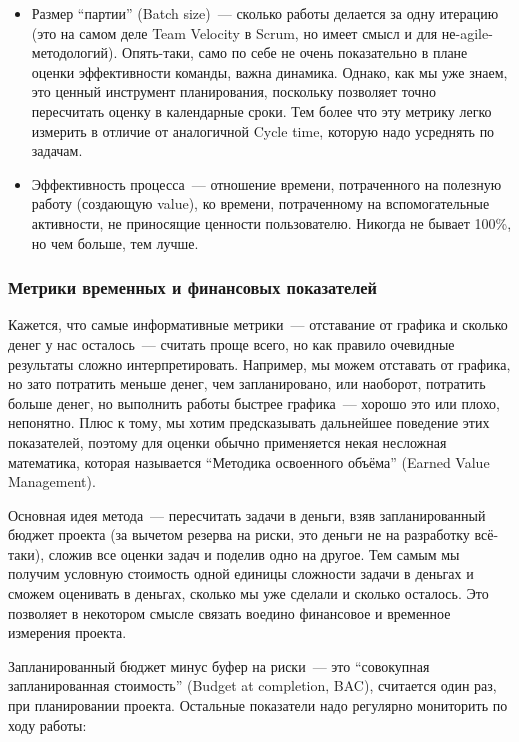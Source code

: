\documentclass{../../text-style}
\begin{document}
\begin{itemize}
    \item Размер \enquote{партии} (Batch size)~--- сколько работы делается за одну итерацию (это на самом деле Team Velocity в Scrum, но имеет смысл и для не-agile-методологий). Опять-таки, само по себе не очень показательно в плане оценки эффективности команды, важна динамика. Однако, как мы уже знаем, это ценный инструмент планирования, поскольку позволяет точно пересчитать оценку в календарные сроки. Тем более что эту метрику легко измерить в отличие от аналогичной Cycle time, которую надо усреднять по задачам.
    \item Эффективность процесса~--- отношение времени, потраченного на полезную работу (создающую value), ко времени, потраченному на вспомогательные активности, не приносящие ценности пользователю. Никогда не бывает 100\%, но чем больше, тем лучше.
\end{itemize}

\subsubsection{Метрики временных и финансовых показателей}

Кажется, что самые информативные метрики~--- отставание от графика и сколько денег у нас осталось~--- считать проще всего, но как правило очевидные результаты сложно интерпретировать. Например, мы можем отставать от графика, но зато потратить меньше денег, чем запланировано, или наоборот, потратить больше денег, но выполнить работы быстрее графика~--- хорошо это или плохо, непонятно. Плюс к тому, мы хотим предсказывать дальнейшее поведение этих показателей, поэтому для оценки обычно применяется некая несложная математика, которая называется \enquote{Методика освоенного объёма} (Earned Value Management).

Основная идея метода~--- пересчитать задачи в деньги, взяв запланированный бюджет проекта (за вычетом резерва на риски, это деньги не на разработку всё-таки), сложив все оценки задач и поделив одно на другое. Тем самым мы получим условную стоимость одной единицы сложности задачи в деньгах и сможем оценивать в деньгах, сколько мы уже сделали и сколько осталось. Это позволяет в некотором смысле связать воедино финансовое и временное измерения проекта.

Запланированный бюджет минус буфер на риски~--- это \enquote{совокупная запланированная стоимость} (Budget at completion, BAC), считается один раз, при планировании проекта. Остальные показатели надо регулярно мониторить по ходу работы:
\end{document}
